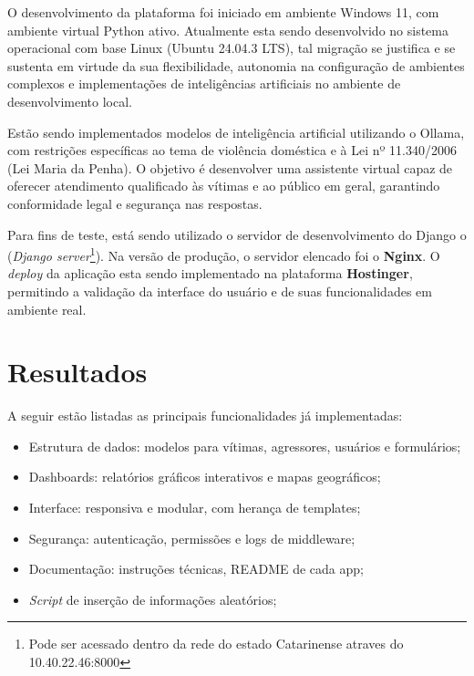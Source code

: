 \par O desenvolvimento da plataforma foi iniciado em ambiente Windows 11, com ambiente virtual Python ativo. Atualmente esta sendo desenvolvido no sistema operacional com base Linux (Ubuntu 24.04.3 LTS), tal migração se justifica e se sustenta em virtude da sua flexibilidade, autonomia na configuração de ambientes complexos e implementações de inteligências artificiais no ambiente de desenvolvimento local.

\par Estão sendo implementados modelos de inteligência artificial utilizando o Ollama, com restrições específicas ao tema de violência doméstica e à Lei nº 11.340/2006 (Lei Maria da Penha). O objetivo é desenvolver uma assistente virtual capaz de oferecer atendimento qualificado às vítimas e ao público em geral, garantindo conformidade legal e segurança nas respostas.

\par Para fins de teste, está sendo utilizado o servidor de desenvolvimento do Django o (\textit{Django server}\footnote{Pode ser acessado dentro da rede do estado Catarinense atraves do 10.40.22.46:8000}). Na versão de produção, o servidor elencado foi o \textbf{Nginx}. O \textit{deploy} da aplicação esta sendo implementado na plataforma \textbf{Hostinger}, permitindo a validação da interface do usuário e de suas funcionalidades em ambiente real.

\section{Resultados}

A seguir estão listadas as principais funcionalidades já implementadas:

\begin{itemize}
    \item Estrutura de dados: modelos para vítimas, agressores, usuários e formulários;
    \item Dashboards: relatórios gráficos interativos e mapas geográficos;
    \item Interface: responsiva e modular, com herança de templates;
    \item Segurança: autenticação, permissões e logs de middleware;
    \item Documentação: instruções técnicas, README de cada app;
    \item \textit{Script} de inserção de informações aleatórios;
\end{itemize}

